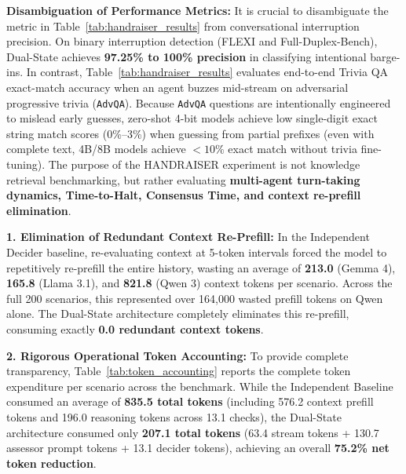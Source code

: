 \documentclass{article}
\begin{document}
\textbf{Disambiguation of Performance Metrics:}
It is crucial to disambiguate the metric in Table~\ref{tab:handraiser_results} from conversational interruption precision. On binary interruption detection (FLEXI and Full-Duplex-Bench), Dual-State achieves \textbf{97.25\% to 100\% precision} in classifying intentional barge-ins. In contrast, Table~\ref{tab:handraiser_results} evaluates end-to-end Trivia QA exact-match accuracy when an agent buzzes mid-stream on adversarial progressive trivia (\texttt{AdvQA}). Because \texttt{AdvQA} questions are intentionally engineered to mislead early guesses, zero-shot 4-bit models achieve low single-digit exact string match scores (0\%--3\%) when guessing from partial prefixes (even with complete text, 4B/8B models achieve $<10\%$ exact match without trivia fine-tuning). The purpose of the HANDRAISER experiment is not knowledge retrieval benchmarking, but rather evaluating \textbf{multi-agent turn-taking dynamics, Time-to-Halt, Consensus Time, and context re-prefill elimination}.

\textbf{1. Elimination of Redundant Context Re-Prefill:}
In the Independent Decider baseline, re-evaluating context at 5-token intervals forced the model to repetitively re-prefill the entire history, wasting an average of \textbf{213.0} (Gemma 4), \textbf{165.8} (Llama 3.1), and \textbf{821.8} (Qwen 3) context tokens per scenario. Across the full 200 scenarios, this represented over 164,000 wasted prefill tokens on Qwen alone. The Dual-State architecture completely eliminates this re-prefill, consuming exactly \textbf{0.0 redundant context tokens}.

\textbf{2. Rigorous Operational Token Accounting:}
To provide complete transparency, Table~\ref{tab:token_accounting} reports the complete token expenditure per scenario across the benchmark. While the Independent Baseline consumed an average of \textbf{835.5 total tokens} (including 576.2 context prefill tokens and 196.0 reasoning tokens across 13.1 checks), the Dual-State architecture consumed only \textbf{207.1 total tokens} (63.4 stream tokens + 130.7 assessor prompt tokens + 13.1 decider tokens), achieving an overall \textbf{75.2\% net token reduction}.
\end{document}
